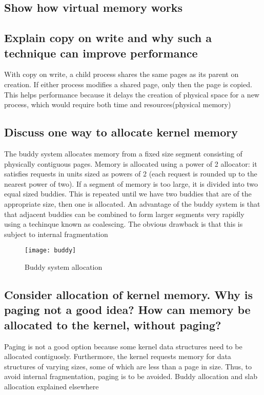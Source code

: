 \documentclass{article}
\begin{document}
\subsection{Show how virtual memory works}

\subsection{Explain copy on write and why such a technique can improve performance}
With copy on write, a child process shares the same pages as its parent on creation. If either process modifies a shared page, only then the page is copied. This helps performance because it delays the creation of physical space for a new process, which would require both time and resources(physical memory)

\subsection{Discuss one way to allocate kernel memory}
The buddy system allocates memory from a fixed size segment consisting of physically contiguous pages. Memory is allocated using a power of 2 allocator: it satisfies requests in units sized as powers of 2 (each request is rounded up to the nearest power of two). If a segment of memory is too large, it is divided into two equal sized buddies. This is repeated until we have two buddies that are of the appropriate size, then one is allocated. An advantage of the buddy system is that that adjacent buddies can be combined to form larger segments very rapidly using a techinque known as coalescing. The obvious drawback is that this is subject to internal fragmentation
\begin{figure}[ht]
    \centering
    \texttt{[image: buddy]}
    \caption{Buddy system allocation}
\end{figure}

\subsection{Consider allocation of kernel memory. Why is paging not a good idea? How can memory be allocated to the kernel, without paging?}
Paging is not a good option because some kernel data structures need to be allocated contiguosly. Furthermore, the kernel requests memory for data structures of varying sizes, some of which are less than a page in size. Thus, to avoid internal fragmentation, paging is to be avoided. Buddy allocation and slab allocation explained elsewhere
\end{document}
